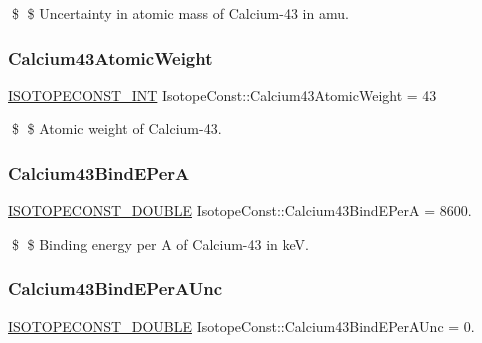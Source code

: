 \$ \$ Uncertainty in atomic mass of Calcium-\/43 in amu. \mbox{\label{group___isotope_const-_calcium-_ca43_gac2ecb66956b66a0a262e9b52c2a46e37}} 
\subsubsection{\texorpdfstring{Calcium43\+Atomic\+Weight}{Calcium43AtomicWeight}}
{\footnotesize\ttfamily \mbox{\hyperlink{group___isotope_const-_macros_ga5f18360b3e99483a35c32d789e62621c}{I\+S\+O\+T\+O\+P\+E\+C\+O\+N\+S\+T\+\_\+\+I\+NT}} Isotope\+Const\+::\+Calcium43\+Atomic\+Weight = 43}

\$ \$ Atomic weight of Calcium-\/43. \mbox{\label{group___isotope_const-_calcium-_ca43_ga73c97752f0f31568074b12481be8ffcb}} 
\subsubsection{\texorpdfstring{Calcium43\+Bind\+E\+PerA}{Calcium43BindEPerA}}
{\footnotesize\ttfamily \mbox{\hyperlink{group___isotope_const-_macros_ga8f45a7272ce02c0b4c65c44636ed719a}{I\+S\+O\+T\+O\+P\+E\+C\+O\+N\+S\+T\+\_\+\+D\+O\+U\+B\+LE}} Isotope\+Const\+::\+Calcium43\+Bind\+E\+PerA = 8600.}

\$ \$ Binding energy per A of Calcium-\/43 in keV. \mbox{\label{group___isotope_const-_calcium-_ca43_ga89c4050857861f77be31a434563fe29d}} 
\subsubsection{\texorpdfstring{Calcium43\+Bind\+E\+Per\+A\+Unc}{Calcium43BindEPerAUnc}}
{\footnotesize\ttfamily \mbox{\hyperlink{group___isotope_const-_macros_ga8f45a7272ce02c0b4c65c44636ed719a}{I\+S\+O\+T\+O\+P\+E\+C\+O\+N\+S\+T\+\_\+\+D\+O\+U\+B\+LE}} Isotope\+Const\+::\+Calcium43\+Bind\+E\+Per\+A\+Unc = 0.}

